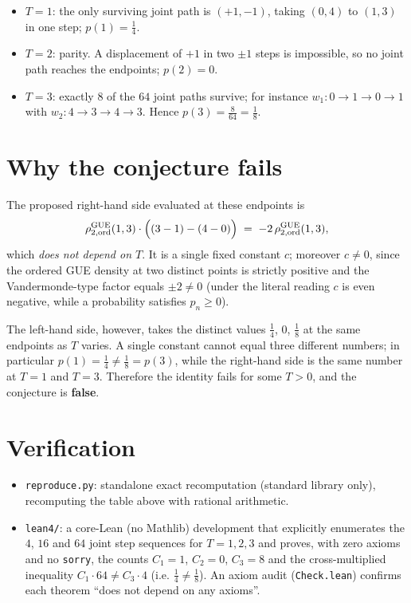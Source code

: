 \documentclass[11pt]{article}
\begin{document}
\begin{itemize}
\item $T=1$: the only surviving joint path is $(+1,-1)$, taking $(0,4)$ to $(1,3)$
  in one step; $p(1)=\tfrac14$.
\item $T=2$: parity. A displacement of $+1$ in two $\pm1$ steps is impossible, so
  no joint path reaches the endpoints; $p(2)=0$.
\item $T=3$: exactly $8$ of the $64$ joint paths survive; for instance
  $w_1\colon 0\to1\to0\to1$ with $w_2\colon 4\to3\to4\to3$.
  Hence $p(3)=\tfrac{8}{64}=\tfrac18$.
\end{itemize}

\section{Why the conjecture fails}

The proposed right-hand side evaluated at these endpoints is
\[
\rho^{\mathrm{GUE}}_{2,\mathrm{ord}}(1,3)\cdot
\Bigl((3-1)-(4-0)\Bigr)
\;=\;-2\,\rho^{\mathrm{GUE}}_{2,\mathrm{ord}}(1,3),
\]
which \emph{does not depend on $T$}. It is a single fixed constant $c$; moreover
$c\neq 0$, since the ordered GUE density at two distinct points is strictly
positive and the Vandermonde-type factor equals $\pm2\neq0$ (under the literal
reading $c$ is even negative, while a probability satisfies $p_n\ge 0$).

The left-hand side, however, takes the distinct values $\tfrac14$, $0$, $\tfrac18$
at the same endpoints as $T$ varies. A single constant cannot equal three different
numbers; in particular $p(1)=\tfrac14\neq\tfrac18=p(3)$, while the right-hand side
is the same number at $T=1$ and $T=3$. Therefore the identity fails for some
$T>0$, and the conjecture is \textbf{false}.

\section{Verification}

\begin{itemize}
\item \texttt{reproduce.py}: standalone exact recomputation (standard library
  only), recomputing the table above with rational arithmetic.
\item \texttt{lean4/}: a core-Lean (no Mathlib) development that explicitly
  enumerates the $4$, $16$ and $64$ joint step sequences for $T=1,2,3$ and proves,
  with zero axioms and no \texttt{sorry}, the counts $C_1=1$, $C_2=0$, $C_3=8$ and
  the cross-multiplied inequality $C_1\cdot 64\neq C_3\cdot 4$ (i.e.
  $\tfrac14\neq\tfrac18$). An axiom audit (\texttt{Check.lean}) confirms each
  theorem ``does not depend on any axioms''.
\end{itemize}
\end{document}
